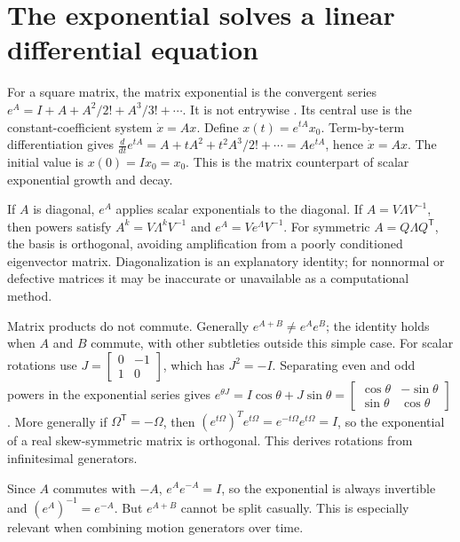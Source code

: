 \section{The exponential solves a linear differential equation}\label{02-foundations-ii-ch026-the-exponential-solves-a-linear-differential-equation}

\hypertarget{02-foundations-ii-ch026-the-exponential-solves-a-linear-differential-equation}{}

For a square matrix, the matrix exponential is the convergent series \(e^A=I+A+A^2/2!+A^3/3!+\cdots\). It is not entrywise . Its central use is the constant-coefficient system \(\dot x=Ax\). Define \(x(t)=e^{tA}x_0\). Term-by-term differentiation gives \(\frac{d}{dt}e^{tA}=A+ tA^2+t^2A^3/2!+\cdots=Ae^{tA}\), hence \(\dot x=Ax\). The initial value is \(x(0)=Ix_0=x_0\). This is the matrix counterpart of scalar exponential growth and decay.

If \(A\) is diagonal, \(e^A\) applies scalar exponentials to the diagonal. If \(A=V\Lambda V^{-1}\), then powers satisfy \(A^k=V\Lambda^kV^{-1}\) and \(e^A=Ve^\Lambda V^{-1}\). For symmetric \(A=Q\Lambda Q^\mathsf T\), the basis is orthogonal, avoiding amplification from a poorly conditioned eigenvector matrix. Diagonalization is an explanatory identity; for nonnormal or defective matrices it may be inaccurate or unavailable as a computational method.

Matrix products do not commute. Generally \(e^{A+B}\ne e^Ae^B\); the identity holds when \(A\) and \(B\) commute, with other subtleties outside this simple case. For scalar rotations use \(J=\begin{bmatrix}0&-1\\1&0\end{bmatrix}\), which has \(J^2=-I\). Separating even and odd powers in the exponential series gives \(e^{\theta J}=I\cos\theta+J\sin\theta=\begin{bmatrix}\cos\theta&-\sin\theta\\\sin\theta&\cos\theta\end{bmatrix}\). More generally if \(\Omega^\mathsf T=-\Omega\), then \((e^{t\Omega})^Te^{t\Omega}=e^{-t\Omega}e^{t\Omega}=I\), so the exponential of a real skew-symmetric matrix is orthogonal. This derives rotations from infinitesimal generators.

Since \(A\) commutes with \(-A\), \(e^Ae^{-A}=I\), so the exponential is always invertible and \((e^A)^{-1}=e^{-A}\). But \(e^{A+B}\) cannot be split casually. This is especially relevant when combining motion generators over time.

